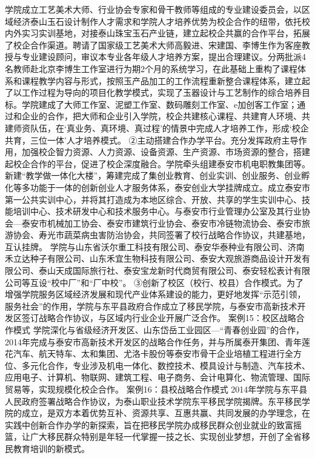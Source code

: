 学院成立工艺美术大师、行业协会专家和骨干教师等组成的专业建设委员会，以区域经济泰山玉石设计制作人才需求和学院人才培养优势为校企合作的纽带，依托校内外实习实训基地，对接泰山珠宝玉石产业链，建立起校企共赢的合作平台，拓展了校企合作渠道。聘请了国家级工艺美术大师高毅进、宋建国、李博生作为客座教授与专业建设顾问，审议本专业各年级人才培养方案，提出合理建议。分两批派4名教师赴北京李博生工作室进行为期2个月的系统学习，在此基础上重构了课程体系和课程教学内容与形式，按照玉产品加工的工作流程重新整合课程体系，建立起了以工作过程为导向的项目化教学模式，实现了玉器设计与工艺制作的综合培养目标。学院建成了大师工作室、泥塑工作室、数码雕刻工作室、e加创客工作室；通过和企业的合作，把大师和企业引入学院，校企共建核心课程、共建育人环境、共建师资队伍，在‘真业务、真环境、真过程’的情景中完成人才培养工作，形成‘校企共育，三位一体’人才培养模式。
②主动搭建合作办学平台。充分发挥政府主导作用，加强校企智力资源、人力资源、设备资源、生产资源、市场资源的整合，搭建起校企合作的平台，促进了校企深度融合。学院牵头组建泰安市机电职教集团等。新建“教学做一体化大楼”，筹建完成了集创业教育、创业实训、创业服务、创业孵化等多功能于一体的创新创业人才服务体系，泰安创业大学挂牌成立。成立泰安市第一公共实训中心，并将其打造成为本地区综合、开放、共享的学生实训中心、技能培训中心、技术研发中心和技术服务中心。与泰安市行业管理办公室及其行业协会—泰安市机械加工协会、泰安市建筑行业协会、泰安市冷链物流协会、泰安市旅游协会、寿光市蔬菜病虫害防治协会，共同签署了校行战略合作协议，共建基地，互认挂牌。
学院与山东省沃尔重工科技有限公司、泰安华泰种业有限公司、济南禾立达种子有限公司、山东禾宜生物科技有限公司、泰安大观旅游商品设计开发有限公司、泰山天成国际旅行社、泰安宝龙新时代商贸有限公司、泰安轻松表计有限公司等互设“校中厂”和“厂中校”。
③创新了校区（校行、校县）合作模式。为了增强学院服务区域经济发展和现代产业体系建设的能力，更好地发挥“示范引领，服务社会”的作用，学院与东平县政府合作成立了移民学院，与泰安市高新技术开发区签订战略合作协议，与区域内行业企业开展广泛合作。
案例15：校区战略合作模式
学院深化与省级经济开发区、山东岱岳工业园区—“青春创业园”的合作，2014年完成与泰安市高新技术开发区的战略合作任务，并与所属泰开集团、青年莲花汽车、航天特车、太和集团、尤洛卡股份等泰安市骨干企业培植工程进行全方位、多元化合作，专业涉及机电一体化、数控技术、模具设计与制造、汽车技术、应用电子、计算机、物联网、建筑工程、电子商务、会计电算化、物流管理、国际贸易等，实现规模化校企合作。
案例16：县校战略合作模式
2014年学院与东平县人民政府签署战略合作协议，为泰山职业技术学院东平移民学院揭牌。东平移民学院的成立，是双方本着优势互补、资源共享、互惠共赢、共同发展的办学理念，在实践中创新合作办学的新探索，旨在把移民学院办成移民群众创业就业的致富摇篮，让广大移民群众特别是年轻一代掌握一技之长、实现创业梦想，开创了全省移民教育培训的新模式。
